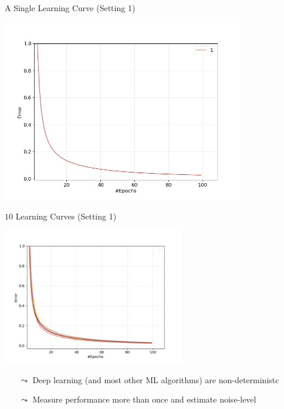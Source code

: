 \begin{frame}[c]{A Single Learning Curve (Setting 1)}

\centering
\includegraphics[width=0.8\textwidth]{scripts/one_learning_curve.jpg}


\end{frame}
\begin{frame}[c]{$10$ Learning Curves  (Setting 1)}

\centering
\includegraphics[width=0.6\textwidth]{scripts/ten_learning_curves.jpg}

\begin{itemize}
	\item[$\leadsto$] Deep learning (and most other ML algorithms) are non-deterministc
	\item[$\leadsto$] Measure performance more than once and estimate noise-level
\end{itemize}


\end{frame}
